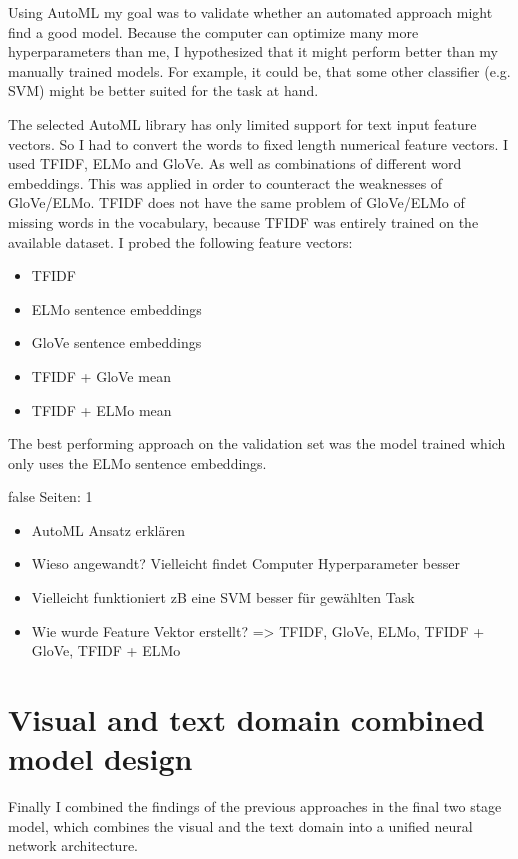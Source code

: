 \documentclass[draft,final,oneside]{vutinfth} %
\begin{document}
Using AutoML my goal was to validate whether an automated approach might find a good model. Because the computer can optimize many more hyperparameters than me, I hypothesized that it might perform better than my manually trained models. For example, it could be, that some other classifier (e.g. SVM) might be better suited for the task at hand.

The selected AutoML library has only limited support for text input feature vectors. So I had to convert the words to fixed length numerical feature vectors. I used TFIDF, ELMo and GloVe. As well as combinations of different word embeddings. This was applied in order to counteract the weaknesses of GloVe/ELMo. TFIDF does not have the same problem of GloVe/ELMo of missing words in the vocabulary, because TFIDF was entirely trained on the available dataset. I probed the following feature vectors:

\begin{itemize}

\item TFIDF
\item ELMo sentence embeddings
\item GloVe sentence embeddings
\item TFIDF + GloVe mean
\item TFIDF + ELMo mean

\end{itemize}

The best performing approach on the validation set was the model trained which only uses the ELMo sentence embeddings.

\if false
Seiten: 1

\begin{itemize}
\item AutoML Ansatz erklären
\item Wieso angewandt? Vielleicht findet Computer Hyperparameter besser
\item Vielleicht funktioniert zB eine SVM besser für gewählten Task
\item Wie wurde Feature Vektor erstellt? => TFIDF, GloVe, ELMo, TFIDF + GloVe, TFIDF + ELMo
\end{itemize}
\fi

\section{Visual and text domain combined model design}

Finally I combined the findings of the previous approaches in the final two stage model, which combines the visual and the text domain into a unified neural network architecture.
\end{document}
